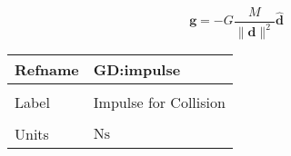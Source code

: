 \documentclass[12pt]{article}
\begin{document}
\begin{displaymath}
\symbf{g}=-G \frac{M}{{\|\symbf{d}\|^{2}}} \symbf{\hat{d}}
\end{displaymath}
\vspace{\baselineskip}
\noindent
\begin{minipage}{\textwidth}
\begin{tabular}{>{\raggedright}p{}>{\raggedright\arraybackslash}p{}}
\toprule \textbf{Refname} & \textbf{GD:impulse}
\label{GD:impulse}
\\ \midrule \\
Label & Impulse for Collision
        
\\ \midrule \\
Units & $\text{N}\text{s}$
        

\end{tabular}
\end{minipage}
\end{document}
